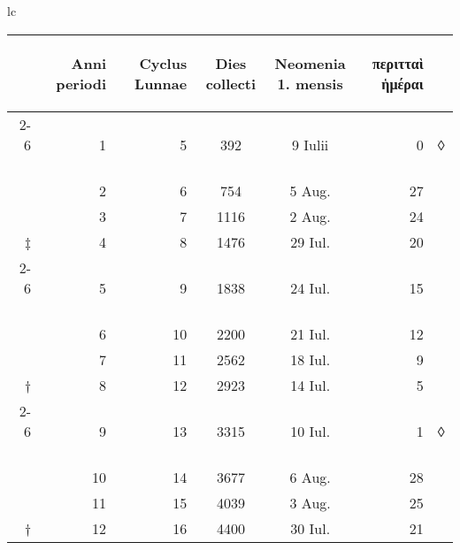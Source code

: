 %
\begin{tabular}{lc}
\begin{tabular}[t]{r rrccr l}
~ &
\begin{rotate}{60}Anni periodi\end{rotate} &
\begin{rotate}{60}Cyclus Lunnae\end{rotate} &
\begin{rotate}{60}Dies collecti\end{rotate} &
\begin{rotate}{60}\hspace{5pt}\parbox[t]{3.5cm}{Neomenia\\1. mensis}\end{rotate} &
\begin{rotate}{60}\textgreek{περιτταὶ ἡμέραι}\end{rotate} &
~
\\
\cline{2-6}
~ &  1 &  5 &  392 &  9 Iulii & 0 & ◊ \\
~ &  2 &  6 &  754 &  5 Aug. & 27 & ~ \\
~ &  3 &  7 & 1116 &  2 Aug. & 24 & ~ \\
‡ &  4 &  8 & 1476 & 29 Iul. & 20 \\
\cline{2-6}
~ &  5 &  9 & 1838 & 24 Iul. & 15 \\
~ &  6 & 10 & 2200 & 21 Iul. & 12 \\
~ &  7 & 11 & 2562 & 18 Iul. &  9 \\
† &  8 & 12 & 2923 & 14 Iul. &  5 \\
\cline{2-6}
~ &  9 & 13 & 3315 & 10 Iul. &  1 & ◊\\
~ & 10 & 14 & 3677 &  6 Aug. & 28 \\
~ & 11 & 15 & 4039 &  3 Aug. & 25 \\
† & 12 & 16 & 4400 & 30 Iul. & 21 \\

\end{tabular}
\end{tabular}
